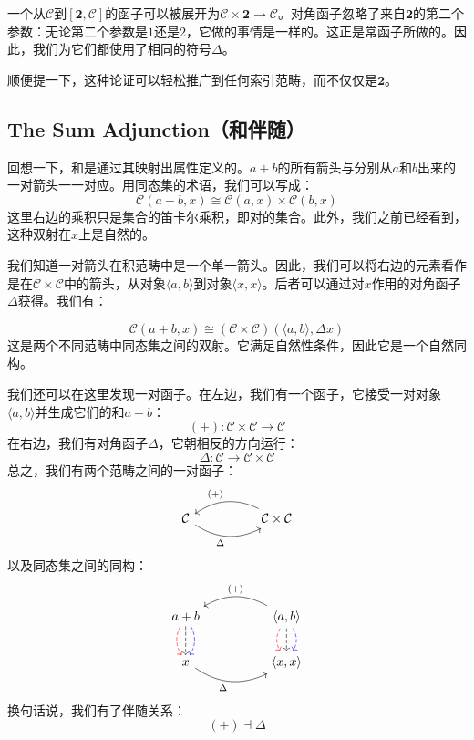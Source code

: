 \documentclass[DaoFP]{subfiles}
\begin{document}
    一个从$\mathcal{C}$到$[\mathbf{2}, \mathcal{C}]$的函子可以被展开为$\mathcal{C} \times \mathbf{2} \to \mathcal{C}$。对角函子忽略了来自$\mathbf{2}$的第二个参数：无论第二个参数是$1$还是$2$，它做的事情是一样的。这正是常函子所做的。因此，我们为它们都使用了相同的符号$\Delta$。

    顺便提一下，这种论证可以轻松推广到任何索引范畴，而不仅仅是$\mathbf{2}$。

    \subsection{The Sum Adjunction（和伴随）}

    回想一下，和是通过其映射出属性定义的。$a + b$的所有箭头与分别从$a$和$b$出来的一对箭头一一对应。用同态集的术语，我们可以写成：
    \[  \mathcal{C} (a + b, x) \cong \mathcal{C}( a , x) \times \mathcal{C}( b , x)\]
    这里右边的乘积只是集合的笛卡尔乘积，即对的集合。此外，我们之前已经看到，这种双射在$x$上是自然的。

    我们知道一对箭头在积范畴中是一个单一箭头。因此，我们可以将右边的元素看作是在$\mathcal{C} \times \mathcal{C}$中的箭头，从对象$\langle a, b \rangle$到对象$\langle x, x \rangle$。后者可以通过对$x$作用的对角函子$\Delta$获得。我们有：

    \[  \mathcal{C} (a + b, x) \cong (\mathcal{C} \times \mathcal{C})( \langle a, b \rangle , \Delta x)\]
    这是两个不同范畴中同态集之间的双射。它满足自然性条件，因此它是一个自然同构。

    我们还可以在这里发现一对函子。在左边，我们有一个函子，它接受一对对象$\langle a, b \rangle$并生成它们的和$a + b$：
    \[ (+) \colon \mathcal{C} \times \mathcal{C} \to \mathcal{C}\]
    在右边，我们有对角函子$\Delta$，它朝相反的方向运行：
    \[ \Delta \colon \mathcal{C} \to  \mathcal{C} \times \mathcal{C} \]
    总之，我们有两个范畴之间的一对函子：
    \[
        \begin{tikzcd}
            \mathcal{C}
            \arrow[rr, bend right, "\Delta"']
            &&
            \mathcal{C} \times \mathcal{C}
            \arrow[ll, bend right, "(+)"']
        \end{tikzcd}
    \]
    以及同态集之间的同构：
    \[
        \begin{tikzcd}
            a + b
            \arrow[d, bend right, red, dashed]
            \arrow[d, dashed]
            \arrow[d, bend left, blue, dashed]
            &&
            \langle a , b \rangle
            \arrow[d, bend right, red, dashed]
            \arrow[d, dashed]
            \arrow[d, bend left, blue, dashed]
            \arrow[ll, bend right, "(+)"']
            \\
            x
            \arrow[rr, bend right, "\Delta"']
            &&
            \langle x, x \rangle
        \end{tikzcd}
    \]
    换句话说，我们有了伴随关系：
    \[ (+) \dashv \Delta \]
\end{document}
